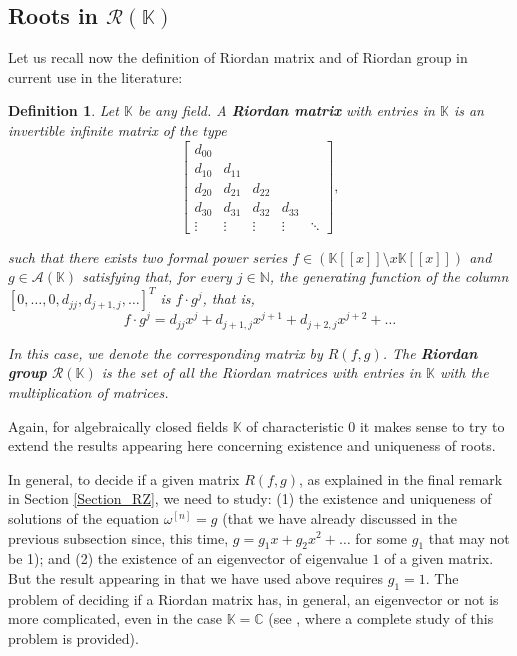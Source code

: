\documentclass[preprint,12pt]{elsarticle}
\newtheorem{defi}{Definition}
\begin{document}
 



\subsection{Roots in \texorpdfstring{$\mathcal R(\mathbb K)$}{R(K)}}

Let us recall now the definition of Riordan matrix and of Riordan group in current use in the literature:

\begin{defi} \label{Defi_RK} Let $\mathbb K$ be any field. A \textbf{Riordan matrix} with entries in $\mathbb K$ is an  invertible infinite matrix of the type
$$\begin{bmatrix} d_{00}\\ d_{10} & d_{11}\\ d_{20} & d_{21} & d_{22} \\ d_{30} & d_{31} & d_{32} & d_{33} \\ \vdots & \vdots & \vdots & \vdots & \ddots \end{bmatrix},$$

\noindent  such that there exists two formal power series $f\in (\mathbb K[[x]]\setminus x\mathbb K[[x]])$ and $g\in\mathcal A(\mathbb K)$ satisfying that, for every $j\in\mathbb N$, the generating function of the column $[0,\dots,0,d_{jj},d_{j+1,j},\ldots]^T$ is $f\cdot g^j$, that is,
$$f\cdot g^j=d_{jj}x^j+d_{j+1,j}x^{j+1}+d_{j+2,j}x^{j+2}+\ldots$$

\noindent In this case, we denote the corresponding matrix by $R(f,g)$. The \textbf{Riordan group} $\mathcal R(\mathbb K)$ is the set of all the Riordan matrices with entries in $\mathbb K$ with the multiplication of matrices.
\end{defi}

Again, for algebraically closed fields $\mathbb K$ of characteristic 0 it makes sense to try to extend the results appearing here concerning existence and uniqueness of roots. 


In general, to decide if a given matrix $R(f,g)$, as explained in the final remark in Section \ref{Section_RZ}, we need to study: (1) the existence and uniqueness of solutions of the equation $\omega^{[n]}=g$ (that we have already discussed in the previous subsection since, this time, $g=g_1x+g_2x^2+\ldots$ for some $g_1$ that may not be 1); and (2) the existence of an eigenvector of eigenvalue $1$ of a given matrix. But the result appearing in \cite{LMP} that we have used above requires $g_1=1$.  The problem of deciding if a Riordan matrix has, in general, an eigenvector or not is more complicated, even in the case $\mathbb K=\mathbb C$ (see \cite{CPT}, where a complete study of this problem is provided).
\end{document}
